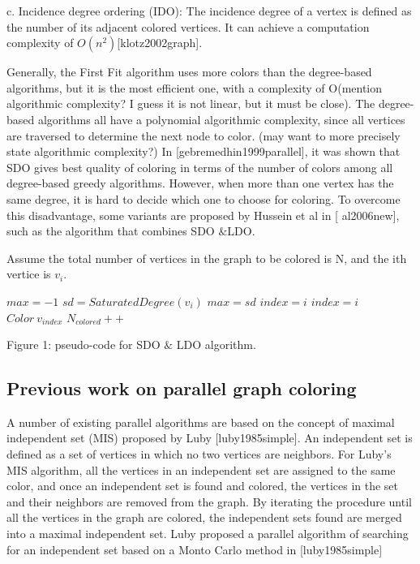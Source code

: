 \documentclass[preprint]{sigplanconf}
\begin{document}
c. Incidence degree ordering (IDO): The incidence degree of a vertex is defined as the number of its adjacent colored vertices. It can achieve a computation complexity of $O(n^2)$[klotz2002graph].

Generally, the First Fit algorithm uses more colors than the degree-based algorithms, but it is the most efficient one, with a complexity of O(mention algorithmic complexity?  I guess it is not linear, but it must be close).  The degree-based algorithms all have a polynomial algorithmic complexity, since all vertices are traversed to determine the next node to color. (may want to more precisely state algorithmic complexity?)  In [gebremedhin1999parallel], it was shown that SDO gives best quality of coloring in terms of  the number of colors among all degree-based greedy algorithms.   However, when more than one vertex has the same degree, it is hard to decide which one to choose for coloring.  To overcome this disadvantage,  some variants are proposed by Hussein et al in [ al2006new], such as the algorithm that combines SDO $\& $LDO.

\renewcommand{\algorithmicrequire}{\textbf{phase}}
Assume the total number of vertices in the graph to be colored is N,
and the ith vertice is $v_i$.
\begin{algorithm}
\begin{algorithmic}
    \STATE  $ max = -1$
           \STATE $sd = SaturatedDegree(v_i) $
               \STATE $max = sd$
               \STATE $index = i$
           \ENDIF
                 \STATE $index = i$
             \ENDIF
           \ENDIF
        \STATE $ Color \:v_{index} $
        \STATE $N_{colored} ++$
        \ENDIF
    \ENDFOR
\ENDWHILE
\end{algorithmic}
\end{algorithm}


Figure 1: pseudo-code for SDO $\&$ LDO algorithm.

\subsection{Previous work on parallel graph coloring}

A number of existing parallel algorithms are based on the concept of maximal independent set (MIS) proposed by Luby [luby1985simple]. An independent set is defined as a set of vertices in which no two vertices are neighbors. For Luby’s MIS algorithm, all the vertices in an independent set are assigned to the same color, and once an independent set is found and colored, the vertices in the set and their neighbors are removed from the graph. By iterating the procedure until all the vertices in the graph are colored, the independent sets found are merged into a maximal independent set. Luby proposed a parallel algorithm of searching for an independent set based on a Monto Carlo method in [luby1985simple]
\end{document}
